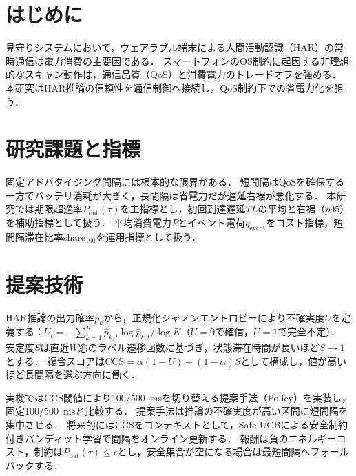 \documentclass[a4paper,10pt,twocolumn]{ltjsarticle}
\newcommand{\Pout}{P_{\mathrm{out}}}
\newcommand{\epsout}{\epsilon}
\begin{document}
\twocolumn[
\begin{center}
  {\normalsize \AbstTitle\par}
  \vspace{0.5mm}
  {\small \AbstAuthor\quad \AbstAdvisor\par}
  {\small \AbstAffiliation\par}
  \vspace{2mm}
\end{center}
]

\section{はじめに}
見守りシステムにおいて，ウェアラブル端末による人間活動認識（HAR）の常時通信は電力消費の主要因である．
スマートフォンのOS制約に起因する非理想的なスキャン動作は，通信品質（QoS）と消費電力のトレードオフを強める．
本研究はHAR推論の信頼性を通信制御へ接続し，QoS制約下での省電力化を狙う．

\section{研究課題と指標}
固定アドバタイジング間隔には根本的な限界がある．
短間隔はQoSを確保する一方でバッテリ消耗が大きく，長間隔は省電力だが遅延右裾が悪化する．
本研究では期限超過率$\Pout(\tau)$を主指標とし，初回到達遅延$TL$の平均と右裾（$p95$）を補助指標として扱う．
平均消費電力$P$とイベント電荷$q_{\mathrm{event}}$をコスト指標，短間隔滞在比率share$_{100}$を運用指標として扱う．

\section{提案技術}
HAR推論の出力確率$\hat{p}_k$から，正規化シャノンエントロピーにより不確実度$U$を定義する：$U_t=-\sum_{k=1}^{K}\hat{p}_{k,t}\log\hat{p}_{k,t}/\log K$（$U=0$で確信，$U=1$で完全不定）．
安定度$S$は直近$W$窓のラベル遷移回数に基づき，状態滞在時間が長いほど$S\to 1$とする．
複合スコアは$\mathrm{CCS}=\alpha(1-U)+(1-\alpha)S$として構成し，値が高いほど長間隔を選ぶ方向に働く．

\par
実機ではCCS閾値により100/500~msを切り替える提案手法（Policy）を実装し，固定100/500~msと比較する．
提案手法は推論の不確実度が高い区間に短間隔を集中させる．
将来的にはCCSをコンテキストとして，Safe-UCBによる安全制約付きバンディット学習で間隔をオンライン更新する．
報酬は負のエネルギーコスト，制約は$\Pout(\tau)\le\epsout$とし，安全集合が空になる場合は最短間隔へフォールバックする．
\end{document}
